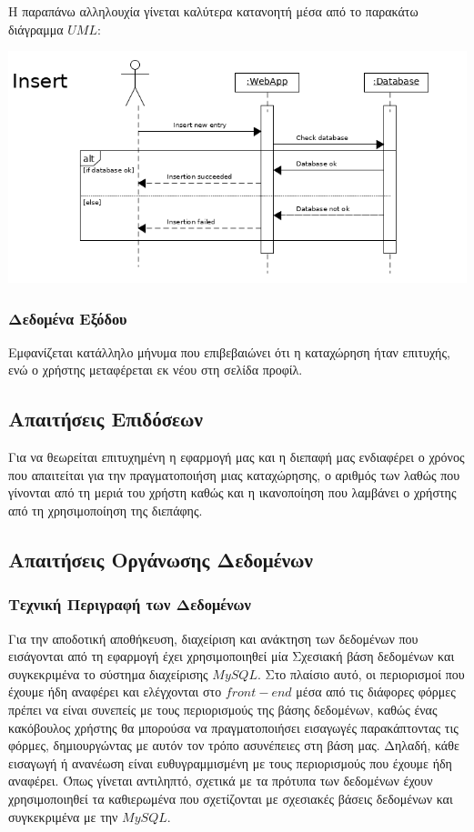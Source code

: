 \documentclass[12pt]{article}
\begin{document}
Η παραπάνω αλληλουχία γίνεται καλύτερα κατανοητή μέσα από το παρακάτω διάγραμμα $UML$:

\begin{center}
\includegraphics[scale=0.5]{UML/insertSequence.png}
\end{center}

\subsubsection{Δεδομένα Εξόδου}

Εμφανίζεται κατάλληλο μήνυμα που επιβεβαιώνει ότι η καταχώρηση ήταν επιτυχής, ενώ ο χρήστης μεταφέρεται εκ νέου στη σελίδα προφίλ.

\subsection{Απαιτήσεις Επιδόσεων}

Για να θεωρείται επιτυχημένη η εφαρμογή μας και η διεπαφή μας ενδιαφέρει ο χρόνος που απαιτείται για την πραγματοποιήση μιας καταχώρησης, ο αριθμός των λαθώς που γίνονται από τη μεριά του χρήστη καθώς και η ικανοποίηση που λαμβάνει ο χρήστης από τη χρησιμοποίηση της διεπάφης. 


\subsection{Απαιτήσεις Οργάνωσης Δεδομένων}

\subsubsection{Τεχνική Περιγραφή των Δεδομένων}

Για την αποδοτική αποθήκευση, διαχείριση  και ανάκτηση των δεδομένων που εισάγονται από τη εφαρμογή έχει χρησιμοποιηθεί μία Σχεσιακή βάση δεδομένων και συγκεκριμένα το σύστημα διαχείρισης $MySQL$. Στο πλαίσιο αυτό, οι περιορισμοί που έχουμε ήδη αναφέρει και ελέγχονται στο $front-end$ μέσα από τις διάφορες φόρμες πρέπει να είναι συνεπείς με τους περιορισμούς της βάσης δεδομένων, καθώς ένας κακόβουλος χρήστης θα μπορούσα να πραγματοποιήσει εισαγωγές παρακάπτοντας τις φόρμες, δημιουργώντας με αυτόν τον τρόπο ασυνέπειες στη βάση μας. Δηλαδή, κάθε εισαγωγή ή ανανέωση είναι ευθυγραμμισμένη με τους περιορισμούς που έχουμε ήδη αναφέρει. Όπως γίνεται αντιληπτό, σχετικά με τα πρότυπα των δεδομένων έχουν χρησιμοποιηθεί τα καθιερωμένα που σχετίζονται με σχεσιακές βάσεις δεδομένων και συγκεκριμένα με την $MySQL$. 
\end{document}
